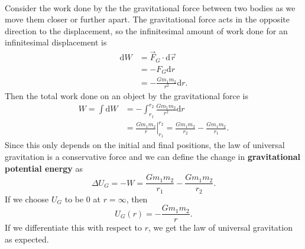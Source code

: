 \documentclass[../newtonian_mechanics.tex]{subfiles}
\begin{document}
        \paragraph{}
        Consider the work done by the the gravitational force between two bodies as we move them closer or further apart.
        The gravitational force acts in the opposite direction to the displacement, so the infinitesimal amount of work done for an infinitesimal displacement is
        \begin{align}
            \mathrm{d}W&=\vec{F}_G\cdot\mathrm{d}\vec{r}\\
            &=-F_G\mathrm{d}r\\
            &=-\frac{Gm_1m_2}{r^2}\mathrm{d}r.
        \end{align}
        Then the total work done on an object by the gravitational force is
        \begin{align}
            W=\int\mathrm{d}W&=-\int_{r_1}^{r_2}\frac{Gm_1m_2}{r^2}\mathrm{d}r\\
            &=\left.\frac{Gm_1m_2}{r}\right|_{r_1}^{r_2}=\frac{Gm_1m_2}{r_2}-\frac{Gm_1m_2}{r_1}.
        \end{align}
        Since this only depends on the initial and final positions, the law of universal gravitation is a conservative force and we can define the change in \textbf{gravitational potential energy} as
        \begin{equation}
            \Delta U_G=-W=\frac{Gm_1m_2}{r_1}-\frac{Gm_1m_2}{r_2}.
        \end{equation}
        If we choose $U_G$ to be 0 at $r=\infty$, then
        \begin{equation}
            U_G(r)=-\frac{Gm_1m_2}{r}.
        \end{equation}
        If we differentiate this with respect to $r$, we get the law of universal gravitation as expected.
\end{document}
